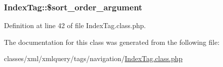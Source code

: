 \subsubsection[{\$sort\+\_\+order\+\_\+argument}]{\setlength{\rightskip}{0pt plus 5cm}Index\+Tag\+::\$sort\+\_\+order\+\_\+argument}\label{classIndexTag_af25bb5754a767188b72ee872e35414e6}


Definition at line 42 of file Index\+Tag.\+class.\+php.



The documentation for this class was generated from the following file\+:\begin{DoxyCompactItemize}
\item 
classes/xml/xmlquery/tags/navigation/\hyperlink{IndexTag_8class_8php}{Index\+Tag.\+class.\+php}\end{DoxyCompactItemize}
